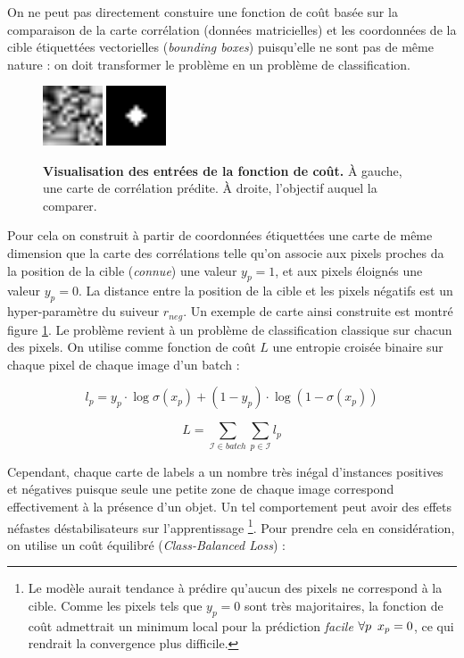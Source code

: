 \documentclass[10pt,twocolumn,letterpaper,french]{article}
\begin{document}
On ne peut pas directement constuire une fonction de coût basée sur la comparaison de la carte corrélation (données matricielles) et les coordonnées de la cible étiquettées vectorielles (\textit{bounding boxes}) puisqu'elle ne sont pas de même nature : on doit transformer le problème en un problème de classification.

\begin{figure}[!h]
\centering
\includegraphics[width=50pt]{images/loss/predict.png}
\hspace{0.7cm}
\includegraphics[width=50pt]{images/loss/target.png}
\caption{\textbf{Visualisation des entrées de la fonction de coût.} À gauche, une carte de corrélation prédite. À droite, l'objectif auquel la comparer.}
\label{loss_corr}
\end{figure}

Pour cela on construit à partir de coordonnées étiquettées une carte de même dimension que la carte des corrélations telle qu'on associe aux pixels proches da la position de la cible (\textit{connue}) une valeur $y_{p}=1$, et aux pixels éloignés une valeur $y_{p}=0$. La distance entre la position de la cible et les pixels négatifs est un hyper-paramètre du suiveur $r_{neg}$. Un exemple de carte ainsi construite est montré figure \ref{loss_corr}. Le problème revient à un problème de classification classique sur chacun des pixels. On utilise comme fonction de coût $L$ une entropie croisée binaire sur chaque pixel de chaque image d'un batch :

$$l_p = y_{p} \cdot \log \sigma\left(x_{p}\right)+\left(1-y_{p}\right) \cdot \log \left(1-\sigma\left(x_{p}\right)\right)$$

$$L = \sum_{\mathcal{I} \in batch} \sum_{p \in \mathcal{I}} l_p$$

Cependant, chaque carte de labels a un nombre très inégal d'instances positives et négatives puisque seule une petite zone de chaque image correspond effectivement à la présence d'un objet. Un tel comportement peut avoir des effets néfastes déstabilisateurs sur l'apprentissage \footnote{Le modèle aurait tendance à prédire qu'aucun des pixels ne correspond à la cible. Comme les pixels tels que $y_{p}=0$ sont très majoritaires, la fonction de coût admettrait un minimum local pour la prédiction \textit{facile} $\forall p \hspace{0.5em} x_{p}=0$, ce qui rendrait la convergence plus difficile.}. Pour prendre cela en considération, on utilise un coût équilibré (\textit{Class-Balanced Loss}) :
\end{document}
